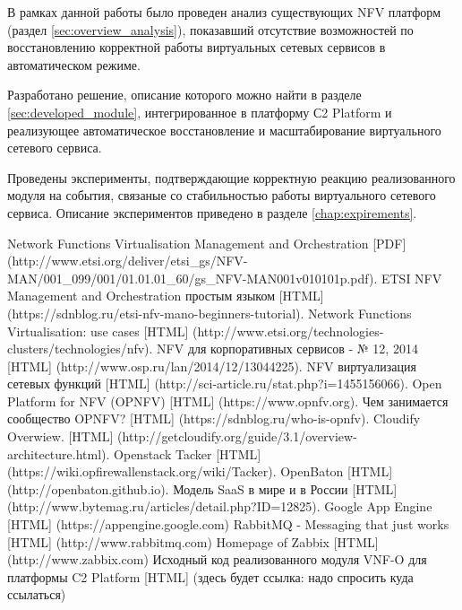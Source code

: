 \documentclass[oneside,final,14pt,a4paper]{extreport}
\begin{document}
В рамках данной работы было проведен анализ существующих NFV платформ (раздел \ref{sec:overview_analysis}), показавший отсутствие возможностей по восстановлению корректной работы виртуальных сетевых сервисов в автоматическом режиме.

Разработано решение, описание которого можно найти в разделе \ref{sec:developed_module}, интегрированное в платформу С2 Platform и реализующее автоматическое восстановление и масштабирование виртуального сетевого сервиса.

Проведены эксперименты, подтверждающие корректную реакцию реализованного модуля на события, связаные со стабильностью работы виртуального сетевого сервиса. Описание экспериментов приведено в разделе \ref{chap:expirements}.





\begin{thebibliography}{00}
 Network Functions Virtualisation Management and Orchestration [PDF] (http://www.etsi.org/deliver/etsi\_gs/NFV-MAN/001\_099/001/01.01.01\_60/gs\_NFV-MAN001v010101p.pdf).
 ETSI NFV Management and Orchestration простым языком [HTML] (https://sdnblog.ru/etsi-nfv-mano-beginners-tutorial).
 Network Functions Virtualisation: use cases [HTML] (http://www.etsi.org/technologies-clusters/technologies/nfv).
 NFV для корпоративных сервисов - № 12, 2014 [HTML] (http://www.osp.ru/lan/2014/12/13044225).
 NFV виртуализация сетевых функций [HTML] (http://sci-article.ru/stat.php?i=1455156066).
 Open Platform for NFV (OPNFV) [HTML] (https://www.opnfv.org).
 Чем занимается сообщество OPNFV? [HTML] (https://sdnblog.ru/who-is-opnfv).
 Cloudify Overwiew. [HTML] (http://getcloudify.org/guide/3.1/overview-architecture.html).
 Openstack Tacker [HTML] (https://wiki.opfirewallenstack.org/wiki/Tacker).
 OpenBaton [HTML] (http://openbaton.github.io).
 Модель SaaS в мире и в России [HTML] (http://www.bytemag.ru/articles/detail.php?ID=12825).
 Google App Engine [HTML] (https://appengine.google.com)
 RabbitMQ - Messaging that just works [HTML] (http://www.rabbitmq.com)
 Homepage of Zabbix [HTML] (http://www.zabbix.com)
 Исходный код реализованного модуля VNF-O для платформы C2 Platform [HTML] (здесь будет ссылка: надо спросить куда ссылаться)
\end{thebibliography}

\end{document}
